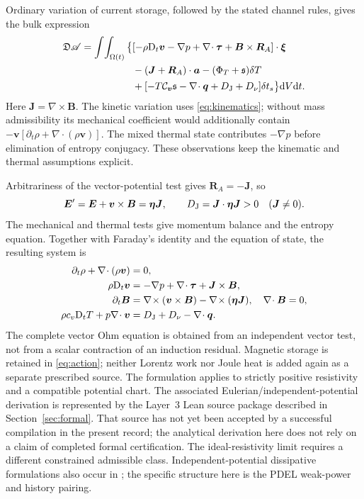 \documentclass[11pt,a4paper]{article}
\theoremstyle{remark}\newtheorem{remark}{Remark}
\numberwithin{equation}{section}
\newcommand{\dd}{\mathrm{d}}
\newcommand{\vv}{\boldsymbol v}
\newcommand{\BB}{\boldsymbol B}
\newcommand{\JJ}{\boldsymbol J}
\newcommand{\EE}{\boldsymbol E}
\newcommand{\xii}{\boldsymbol\xi}
\newcommand{\atest}{\boldsymbol a}
\newcommand{\ttau}{\boldsymbol\tau}
\newcommand{\etab}{\boldsymbol\eta}
\newcommand{\qv}{\boldsymbol q}
\newcommand{\grad}{\nabla}
\newcommand{\diver}{\nabla\!\cdot}
\newcommand{\curl}{\nabla\!\times}
\newcommand{\Dt}{\mathrm D_t}
\newcommand{\Cv}{\mathcal C_{\vv}}
\newcommand{\st}{\mathfrak s}
\begin{document}
Ordinary variation of current storage, followed by the stated channel rules, gives the bulk expression
\begin{equation}
\begin{aligned}
\mathfrak D\mathscr A=\int\!\int_{\Omega(t)}\big\{&
[-\rho\Dt\vv-\grad p+\diver\ttau+\BB\times\boldsymbol R_A]\cdot\xii\\
&-(\JJ+\boldsymbol R_A)\cdot\atest-(\Phi_T+\st)\delta T\\
&+[-T\Cv\st-\diver\qv+D_{\rm J}+D_\nu]\delta t_s\big\}\dd V\dd t.
\end{aligned}
\label{eq:jointdifferential}
\end{equation}
Here $\JJ=\curl\BB$. The kinetic variation uses \eqref{eq:kinematics}; without mass admissibility its mechanical coefficient would additionally contain $-\vv[\partial_t\rho+\diver(\rho\vv)]$. The mixed thermal state contributes $-\grad p$ before elimination of entropy conjugacy. These observations keep the kinematic and thermal assumptions explicit.

Arbitrariness of the vector-potential test gives $\boldsymbol R_A=-\JJ$, so
\begin{equation}
\EE'=\EE+\vv\times\BB=\etab\JJ,
\qquad D_{\rm J}=\JJ\cdot\etab\JJ>0\quad(\JJ\ne0).
\label{eq:ohm}
\end{equation}
The mechanical and thermal tests give momentum balance and the entropy equation. Together with Faraday's identity and the equation of state, the resulting system is
\begin{subequations}\label{eq:system}
\begin{align}
\partial_t\rho+\diver(\rho\vv)&=0,\label{eq:mass}\\
\rho\Dt\vv&=-\grad p+\diver\ttau+\JJ\times\BB,\label{eq:mom}\\
\partial_t\BB&=\curl(\vv\times\BB)-\curl(\etab\JJ),
\quad\diver\BB=0,\label{eq:induction}\\
\rho c_v\Dt T+p\diver\vv&=D_{\rm J}+D_\nu-\diver\qv.
\label{eq:heat}
\end{align}
\end{subequations}
The complete vector Ohm equation is obtained from an independent vector test, not from a scalar contraction of an induction residual. Magnetic storage is retained in \eqref{eq:action}; neither Lorentz work nor Joule heat is added again as a separate prescribed source. The formulation applies to strictly positive resistivity and a compatible potential chart. The associated Eulerian/independent-potential derivation is represented by the Layer~3 Lean source package described in Section~\ref{sec:formal}. That source has not yet been accepted by a successful compilation in the present record; the analytical derivation here does not rely on a claim of completed formal certification. The ideal-resistivity limit requires a different constrained admissible class. Independent-potential dissipative formulations also occur in \citet{Carlier}; the specific structure here is the PDEL weak-power and history pairing.
\end{document}
